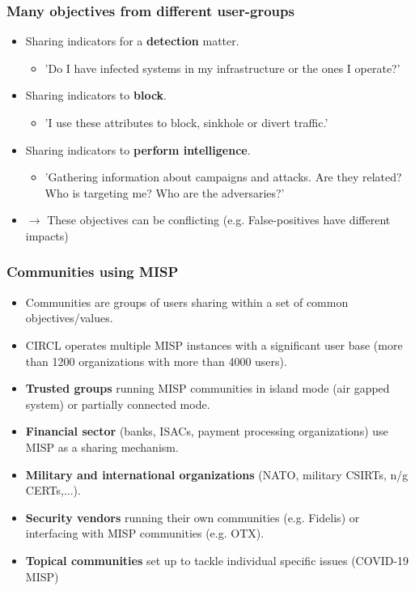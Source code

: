 \begin{frame}
\frametitle{Many objectives from different user-groups}
        \begin{itemize}
                \item Sharing indicators for a {\bf detection} matter.
                        \begin{itemize}
                                \item 'Do I have infected systems in my infrastructure or the ones I operate?'
                        \end{itemize}
                \item Sharing indicators to {\bf block}.
                        \begin{itemize}
                                \item 'I use these attributes to block, sinkhole or divert traffic.'
                        \end{itemize}
                \item Sharing indicators to {\bf perform intelligence}.
                        \begin{itemize}
                                \item 'Gathering information about campaigns and attacks. Are they related? Who is targeting me? Who are the adversaries?'
                        \end{itemize}
                \item $\rightarrow$ These objectives can be conflicting (e.g. False-positives have different impacts)
        \end{itemize}
\end{frame}

\begin{frame}
 \frametitle{Communities using MISP}
 \begin{itemize}
	 \item Communities are groups of users sharing within a set of common objectives/values.
	 \item CIRCL operates multiple MISP instances with a significant user base (more than 1200 organizations with more than 4000 users).
         \item {\bf Trusted groups} running MISP communities in island mode (air gapped system) or partially connected mode.
	 \item {\bf Financial sector} (banks, ISACs, payment processing organizations) use MISP as a sharing mechanism.
	 \item {\bf Military and international organizations} (NATO, military CSIRTs, n/g CERTs,...).
	 \item {\bf Security vendors} running their own communities (e.g. Fidelis) or interfacing with MISP communities (e.g. OTX).
         \item {\bf Topical communities} set up to tackle individual specific issues (COVID-19 MISP)
 \end{itemize}
\end{frame}


